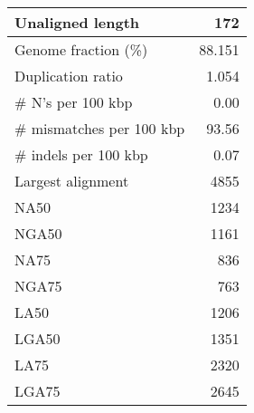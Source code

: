 \documentclass[12pt,a4paper]{article}
\begin{document}
\begin{table}[ht]
\begin{center}
\begin{tabular}{|l*{1}{|r}|}
Unaligned length & 172 \\ \hline
Genome fraction (\%) & 88.151 \\ \hline
Duplication ratio & 1.054 \\ \hline
\# N's per 100 kbp & 0.00 \\ \hline
\# mismatches per 100 kbp & 93.56 \\ \hline
\# indels per 100 kbp & 0.07 \\ \hline
Largest alignment & 4855 \\ \hline
NA50 & 1234 \\ \hline
NGA50 & 1161 \\ \hline
NA75 & 836 \\ \hline
NGA75 & 763 \\ \hline
LA50 & 1206 \\ \hline
LGA50 & 1351 \\ \hline
LA75 & 2320 \\ \hline
LGA75 & 2645 \\ \hline
\end{tabular}
\end{center}
\end{table}
\end{document}
